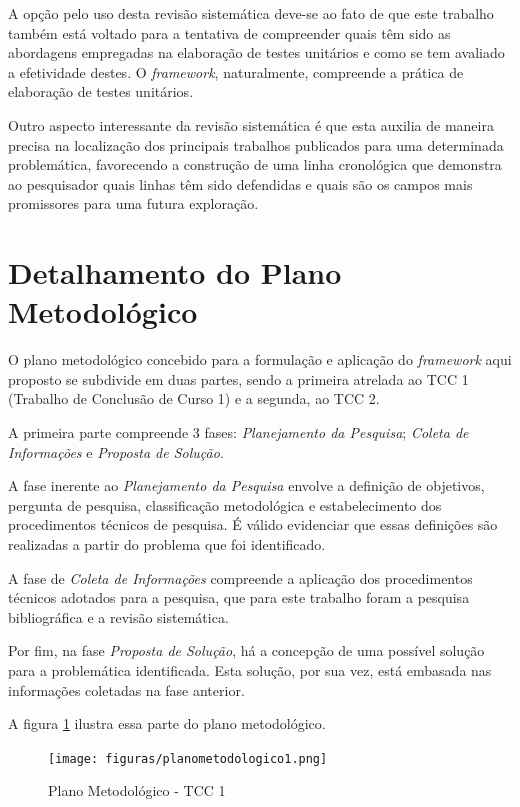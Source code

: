 A opção pelo uso desta revisão sistemática deve-se ao fato de que este trabalho também está voltado para a tentativa de compreender quais têm sido as abordagens empregadas na elaboração de testes unitários e como se tem avaliado a efetividade destes. O \textit{framework}, naturalmente, compreende a prática de elaboração de testes unitários.

Outro aspecto interessante da revisão sistemática é que esta auxilia de maneira precisa na localização dos principais trabalhos publicados para uma determinada problemática, favorecendo a construção de uma linha cronológica que demonstra ao pesquisador quais linhas têm sido defendidas e quais são os campos mais promissores para uma futura exploração.

\section{Detalhamento do Plano Metodológico}

O plano metodológico concebido para a formulação e aplicação do \textit{framework} aqui proposto se subdivide em duas partes, sendo a primeira atrelada ao TCC 1 (Trabalho de Conclusão de Curso 1) e a segunda, ao TCC 2.

A primeira parte compreende 3 fases: \textit{Planejamento da Pesquisa}; \textit{Coleta de Informações} e \textit{Proposta de Solução}.

A fase inerente ao \textit{Planejamento da Pesquisa} envolve a definição de objetivos, pergunta de pesquisa, classificação metodológica e estabelecimento dos procedimentos técnicos de pesquisa. É válido evidenciar que essas definições são realizadas a partir do problema que foi identificado.

A fase de \textit{Coleta de Informações} compreende a aplicação dos procedimentos técnicos adotados para a pesquisa, que para este trabalho foram a pesquisa bibliográfica e a revisão sistemática.

Por fim, na fase \textit{Proposta de Solução}, há a concepção de uma possível solução para a problemática identificada. Esta solução, por sua vez, está embasada nas informações coletadas na fase anterior.

A figura \ref{fig:plano1} ilustra essa parte do plano metodológico.

\begin{figure}[h]
\texttt{[image: figuras/planometodologico1.png]}
\caption{Plano Metodológico - TCC 1}
\label{fig:plano1}
\end{figure}

